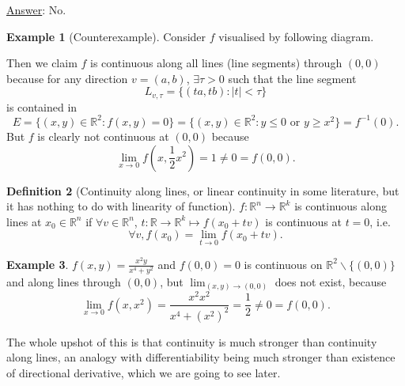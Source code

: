 \documentclass[a4paper]{article}
\theoremstyle{definition}
\newtheorem{defn}{Definition}[subsection]
\newtheorem{eg}[defn]{Example}
\begin{document}
\underline{Answer}: No. \begin{eg}[Counterexample]
	Consider $f$ visualised by following diagram.
\begin{center}
\end{center}
	Then we claim $f$ is continuous along all lines (line segments) through $(0,0)$ because for any direction $v=(a,b)$, $\exists \tau >0$ such that the line segment
\[
L_{v,\tau} = \{(ta,tb):|t|<\tau\}
\]
is contained in
\[
E=\{(x,y)\in \mathbb R^2 : f(x,y)=0\}=\{(x,y)\in\mathbb R^2 : y \leq 0 \text{ or } y \geq x^2\}=f^{-1}(0) .
\]
But $f$ is clearly not continuous at $(0,0)$ because
\[
\lim_{x\rightarrow 0} f\left(x,\frac12 x^2\right) = 1 \neq 0 = f(0,0) .
\]
\end{eg}

\begin{defn}[Continuity along lines, or linear continuity in some literature, but it has nothing to do with linearity of function]
	$f:\mathbb R^n \rightarrow \mathbb R^k$ is continuous along lines at $x_0 \in \mathbb R^n$ if $\forall v \in \mathbb R^n$, $t:\mathbb R \rightarrow \mathbb R^k \mapsto f(x_0+tv)$ is continuous at $t=0$, i.e.
\[
\forall v, f(x_0)=\lim_{t\rightarrow 0} f(x_0+tv).
\]
\end{defn}

\begin{eg}
	$f(x,y)=\frac{x^2y}{x^4+y^2}$ and $f(0,0)=0$ is continuous on $\mathbb R^2 \backslash \{(0,0)\}$ and along lines through $(0,0)$, but $\lim_{(x,y)\rightarrow (0,0)}$ does not exist, because
\[
\lim_{x\rightarrow 0} f(x,x^2)=\frac{x^2 x^2}{x^4+(x^2)^2} = \frac12 \neq 0 = f(0,0) .
\]
\end{eg}

The whole upshot of this is that continuity is much stronger than continuity along lines, an analogy with differentiability being much stronger than existence of directional derivative, which we are going to see later.
\end{document}
